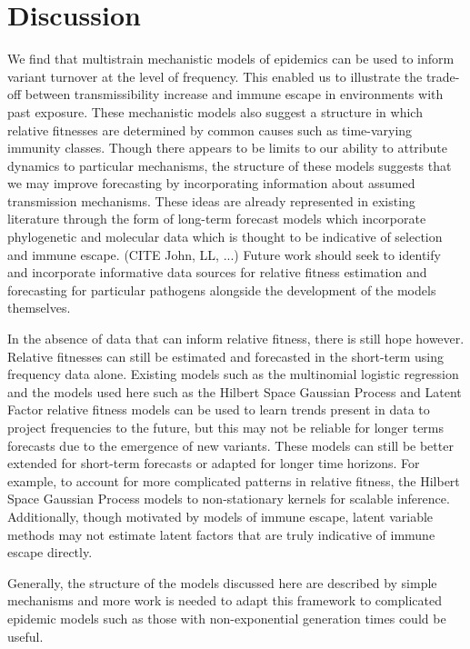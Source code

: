 \documentclass[12pt,oneside,letterpaper]{article}
\begin{document}
\section*{Discussion}

We find that multistrain mechanistic models of epidemics can be used to inform variant turnover at the level of frequency.
This enabled us to illustrate the trade-off between transmissibility increase and immune escape in environments with past exposure.
These mechanistic models also suggest a structure in which relative fitnesses are determined by common causes such as time-varying immunity classes.
Though there appears to be limits to our ability to attribute dynamics to particular mechanisms, the structure of these models suggests that we may improve forecasting by incorporating information about assumed transmission mechanisms.
These ideas are already represented in existing literature through the form of long-term forecast models which incorporate phylogenetic and molecular data which is thought to be indicative of selection and immune escape. (CITE John, LL,  ...)
Future work should seek to identify and incorporate informative data sources for relative fitness estimation and forecasting for particular pathogens alongside the development of the models themselves.

In the absence of data that can inform relative fitness, there is still hope however.
Relative fitnesses can still be estimated and forecasted in the short-term using frequency data alone.
Existing models such as the multinomial logistic regression and the models used here such as the Hilbert Space Gaussian Process and Latent Factor relative fitness models can be used to learn trends present in data to project frequencies to the future, but this may not be reliable for longer terms forecasts due to the emergence of new variants.
These models can still be better extended for short-term forecasts or adapted for longer time horizons.
For example, to account for more complicated patterns in relative fitness, the Hilbert Space Gaussian Process models to non-stationary kernels for scalable inference.
Additionally, though motivated by models of immune escape, latent variable methods may not estimate latent factors that are truly indicative of immune escape directly.

Generally, the structure of the models discussed here are described by simple mechanisms and more work is needed to adapt this framework to complicated epidemic models such as those with non-exponential generation times could be useful.
\end{document}
